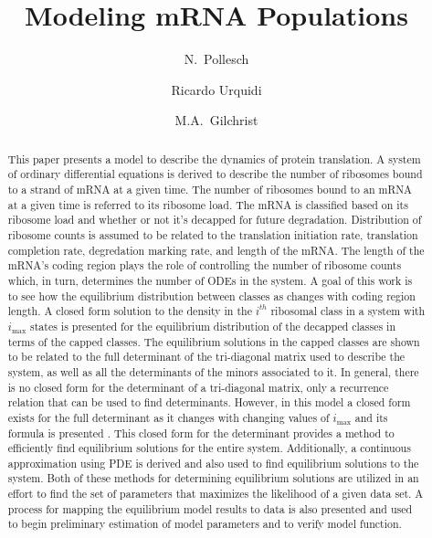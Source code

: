 \documentclass[review]{elsarticle}
\newcommand{\imax}{\ensuremath{i_{\max}}\xspace}
\begin{document}
\title{Modeling mRNA Populations}
\author[utkm,curradd]{N.~Pollesch}
\author[utkgst]{Ricardo Urquidi}
\author[utkeeb,nimbios,cor1]{M.A.~Gilchrist}
\address[utkm]{Department of Mathematics, University of Tennessee,  Knoxville, TN 37996-1320}
\address[utkeeb]{Department of Ecology and Evolutionary Biology, University of Tennessee, Knoxville, TN 37996-1610}
\address[nimbios]{National Institute for Mathematical and Biological Synthesis, University of Tennessee, Knoxville, TN 37996-3410}
\address[utkgst]{Genome Science and Technology Program, University of Tennessee, Knoxville, TN 37996-XXX}

\begin{abstract}
This paper presents a model to describe the dynamics of protein translation.  
A system of ordinary differential equations is derived to describe the number of ribosomes bound to a strand of mRNA at a given time.
The number of ribosomes bound to an mRNA at a given time is referred to its ribosome load.
The mRNA is classified based on its ribosome load and whether or not it's decapped for future degradation.  
Distribution of ribosome counts is assumed to be related to the translation initiation rate, translation completion rate, degredation marking rate, and length of the mRNA.
The length of the mRNA's coding region plays the role of controlling the number of ribosome counts which, in turn, determines the number of ODEs in the system.  
A goal of this work is to see how the equilibrium distribution between classes as changes with coding region length.
A closed form solution to the density in the $i^{th}$ ribosomal class in a system with \imax states is presented for the equilibrium distribution of the decapped classes in terms of the capped classes.
The equilibrium solutions in the capped classes are shown to be related to the full determinant of the tri-diagonal matrix used to describe the system, as well as all the determinants of the minors associated to it.
In general, there is no closed form for the determinant of a tri-diagonal matrix, only a recurrence relation that can be used to find determinants.
However, in this model a closed form exists for the full determinant as it changes with changing values of \imax and its formula is presented .
This closed form for the determinant provides a method to efficiently find equilibrium solutions for the entire system.
Additionally, a continuous approximation using PDE is derived and also used to find equilibrium solutions to the system.
Both of these methods for determining equilibrium solutions are utilized in an effort to find the set of parameters that maximizes the likelihood of a given data set.
A process for mapping the equilibrium model results to data is also presented and used to begin preliminary estimation of model parameters and to verify model function.
 

\end{abstract}
\end{document}
